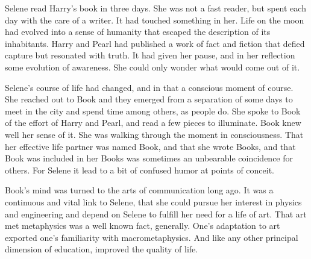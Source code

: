 

﻿Selene read Harry's book in three days.  She was not a fast reader,
but spent each day with the care of a writer.  It had touched
something in her.  Life on the moon had evolved into a sense of
humanity that escaped the description of its inhabitants.  Harry and
Pearl had published a work of fact and fiction that defied capture but
resonated with truth.  It had given her pause, and in her reflection
some evolution of awareness.  She could only wonder what would come
out of it.

Selene's course of life had changed, and in that a conscious moment of
course.  She reached out to Book and they emerged from a separation of
some days to meet in the city and spend time among others, as people
do.  She spoke to Book of the effort of Harry and Pearl, and read a
few pieces to illuminate.  Book knew well her sense of it.  She was
walking through the moment in consciousness.  That her effective life
partner was named Book, and that she wrote Books, and that Book was
included in her Books was sometimes an unbearable coincidence for
others.  For Selene it lead to a bit of confused humor at points of
conceit.

Book's mind was turned to the arts of communication long ago.  It was
a continuous and vital link to Selene, that she could pursue her
interest in physics and engineering and depend on Selene to fulfill
her need for a life of art.  That art met metaphysics was a well known
fact, generally.  One's adaptation to art exported one's familiarity
with macrometaphysics.  And like any other principal dimension of
education, improved the quality of life.

\bye
